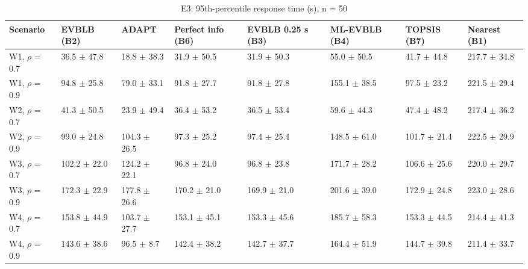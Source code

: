 \begin{table}[t]
\centering
\footnotesize
\caption{E3: 95th-percentile response time (s), n = 50}
\label{tab:e3_p95}
\begin{tabular}{llllllll}
\toprule
Scenario & EVBLB (B2) & ADAPT & Perfect info (B6) & EVBLB 0.25 s (B3) & ML-EVBLB (B4) & TOPSIS (B7) & Nearest (B1) \\
\midrule
W1, $\rho$ = 0.7 & 36.5 $\pm$ 47.8 & 18.8 $\pm$ 38.3 & 31.9 $\pm$ 50.5 & 31.9 $\pm$ 50.3 & 55.0 $\pm$ 50.5 & 41.7 $\pm$ 44.8 & 217.7 $\pm$ 34.8 \\
W1, $\rho$ = 0.9 & 94.8 $\pm$ 25.8 & 79.0 $\pm$ 33.1 & 91.8 $\pm$ 27.7 & 91.8 $\pm$ 27.8 & 155.1 $\pm$ 38.5 & 97.5 $\pm$ 23.2 & 221.5 $\pm$ 29.4 \\
W2, $\rho$ = 0.7 & 41.3 $\pm$ 50.5 & 23.9 $\pm$ 49.4 & 36.4 $\pm$ 53.2 & 36.5 $\pm$ 53.4 & 59.6 $\pm$ 44.3 & 47.4 $\pm$ 48.2 & 217.4 $\pm$ 36.2 \\
W2, $\rho$ = 0.9 & 99.0 $\pm$ 24.8 & 104.3 $\pm$ 26.5 & 97.3 $\pm$ 25.2 & 97.4 $\pm$ 25.4 & 148.5 $\pm$ 61.0 & 101.7 $\pm$ 21.4 & 222.5 $\pm$ 29.9 \\
W3, $\rho$ = 0.7 & 102.2 $\pm$ 22.0 & 124.2 $\pm$ 22.1 & 96.8 $\pm$ 24.0 & 96.8 $\pm$ 23.8 & 171.7 $\pm$ 28.2 & 106.6 $\pm$ 25.6 & 220.0 $\pm$ 29.7 \\
W3, $\rho$ = 0.9 & 172.3 $\pm$ 22.9 & 177.8 $\pm$ 26.6 & 170.2 $\pm$ 21.0 & 169.9 $\pm$ 21.0 & 201.6 $\pm$ 39.0 & 172.9 $\pm$ 24.8 & 223.0 $\pm$ 28.6 \\
W4, $\rho$ = 0.7 & 153.8 $\pm$ 44.9 & 103.7 $\pm$ 27.7 & 153.1 $\pm$ 45.1 & 153.3 $\pm$ 45.6 & 185.7 $\pm$ 58.3 & 153.3 $\pm$ 44.5 & 214.4 $\pm$ 41.3 \\
W4, $\rho$ = 0.9 & 143.6 $\pm$ 38.6 & 96.5 $\pm$ 8.7 & 142.4 $\pm$ 38.2 & 142.7 $\pm$ 37.7 & 164.4 $\pm$ 51.9 & 144.7 $\pm$ 39.8 & 211.4 $\pm$ 33.7 \\
\bottomrule
\end{tabular}
\end{table}

